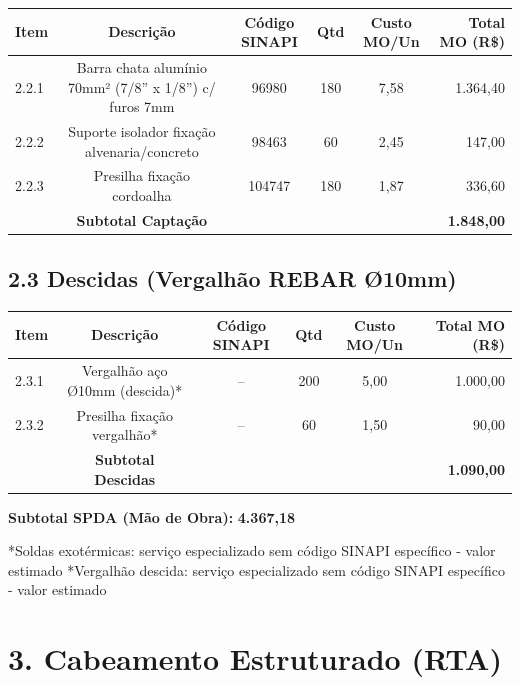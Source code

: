 \documentclass[12pt,a4paper]{article}
\renewenvironment{table}%
{\begin{center}%
\scriptsize%
\addtolength{\tabcolsep}{-2pt}%
}%
{\end{center}}
\begin{document}
\begin{table}
\centering
\begin{tabular}{lccccr}
\toprule
\textbf{Item} & \textbf{Descrição} & \textbf{Código SINAPI} & \textbf{Qtd} & \textbf{Custo MO/Un} & \textbf{Total MO (R\$)} \\
\midrule
2.2.1 & Barra chata alumínio 70mm² (7/8'' x 1/8'') c/ furos 7mm & 96980 & 180 & 7,58 & 1.364,40 \\
2.2.2 & Suporte isolador fixação alvenaria/concreto & 98463 & 60 & 2,45 & 147,00 \\
2.2.3 & Presilha fixação cordoalha & 104747 & 180 & 1,87 & 336,60 \\
\midrule
 & \textbf{Subtotal Captação} & & & & \textbf{1.848,00} \\
\bottomrule
\end{tabular}
\end{table}

\subsection{2.3 Descidas (Vergalhão REBAR Ø10mm)}

\begin{table}
\centering
\begin{tabular}{lccccr}
\toprule
\textbf{Item} & \textbf{Descrição} & \textbf{Código SINAPI} & \textbf{Qtd} & \textbf{Custo MO/Un} & \textbf{Total MO (R\$)} \\
\midrule
2.3.1 & Vergalhão aço Ø10mm (descida)* & -- & 200 & 5,00 & 1.000,00 \\
2.3.2 & Presilha fixação vergalhão* & -- & 60 & 1,50 & 90,00 \\
\midrule
 & \textbf{Subtotal Descidas} & & & & \textbf{1.090,00} \\
\bottomrule
\end{tabular}
\end{table}

\noindent\textbf{Subtotal SPDA (Mão de Obra):} \textbf{4.367,18}

\noindent\small{*Soldas exotérmicas: serviço especializado sem código SINAPI específico - valor estimado}
\noindent\small{*Vergalhão descida: serviço especializado sem código SINAPI específico - valor estimado}

\pagebreak

\section{3. Cabeamento Estruturado (RTA)}
\end{document}
